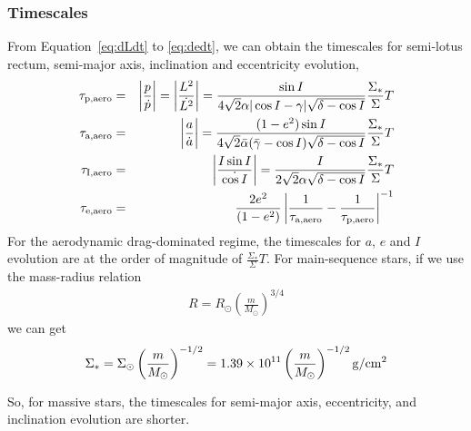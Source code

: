\documentclass[fleqn,usenatbib]{mnras}
\begin{document}
\subsubsection{Timescales}


 From Equation~\ref{eq:dLdt} to \ref{eq:dedt}, we can obtain the timescales for semi-lotus rectum, semi-major axis, inclination and eccentricity evolution,
\begin{eqnarray}
\tau_{\rm p, aero} &=& \bigg|\frac{p}{\dot{p}}\bigg|=\bigg|\frac{L^2}{\dot{L^2}}\bigg|= \frac{\sin I}{4\sqrt{2}\alpha|\cos I - \gamma|\sqrt{{\delta}-\cos I}}\frac{\Sigma_*}{\Sigma}T\\
\tau_{\rm a, aero} &= &\bigg|\frac{a}{\dot{a}}\bigg|= \frac{(1-e^2)\sin I}{4\sqrt{2}\bar{\alpha}(\bar{\gamma}-\cos I)\sqrt{{\delta}-\cos I}}\frac{\Sigma_*}{\Sigma}T\label{eq:t_a_aero}\\
\tau_{\rm I, aero} &=& \bigg|\frac{I\sin I}{\dot{\cos I}}\bigg| = \frac{I}{2\sqrt{2}\alpha\sqrt{{\delta}-\cos I}}\frac{\Sigma_*}{\Sigma}T\label{eq:t_inc,aero}\\
\tau_{\rm e, aero} &=& \frac{2e^2}{(1-e^2)}\left|\frac{1}{\tau_{\rm a, aero}}-\frac{1}{\tau_{\rm p, aero}}\right|^{-1}
\end{eqnarray}
For the aerodynamic drag-dominated regime, the timescales for $a$, $e$ and $I$ evolution are at the order of magnitude of $\frac{\Sigma_*}{\Sigma}T$. For main-sequence stars, if we use the mass-radius relation
\begin{eqnarray}
R = R_\odot(\frac{m}{M_\odot})^{3/4}
\end{eqnarray}
we can get
\begin{eqnarray}
\Sigma_* = \Sigma_\odot \left(\frac{m}{M_\odot}\right)^{-1/2}=1.39\times10^{11}\left(\frac{m}{M_\odot}\right)^{-1/2} \rm g/cm^2
\end{eqnarray}

So, for massive stars, the timescales for semi-major axis, eccentricity, and inclination evolution are shorter.
\end{document}
